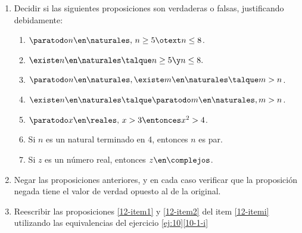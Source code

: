 \begin{enunciado}{\ejercicio}
  \begin{enumerate}[label=\roman*)]
    \item\label{12-itemi}
          Decidir si las siguientes proposiciones son verdaderas o falsas, justificando debidamente:
          \begin{multicols}{2}
            \begin{enumerate}[label=\alph*)]
              \item $\paratodo n \en \naturales,\, n \geq 5 \otext n \leq 8$.
              \item $\existe n \en \naturales \talque n \geq 5 \y n\leq 8.$
              \item $\paratodo n \en \naturales, \existe m \en \naturales \talque m > n$.
              \item $\existe n \en \naturales \talque \paratodo m \en \naturales, m >n$.
              \item\label{12-item1} $\paratodo x \en \reales,\, x > 3 \entonces x^2 > 4$.
              \item\label{12-item2} Si $n$ es un natural terminado en 4, entonces $n$ es par.
              \item Si $z$ es un número real, entonces $z \en \complejos$.
            \end{enumerate}
          \end{multicols}

    \item Negar las proposiciones anteriores, y en cada caso verificar que la proposición negada tiene el valor de verdad
          opuesto al de la original.

    \item Reescribir las proposiciones \ref{12-item1} y \ref{12-item2} del item \ref{12-itemi}
          utilizando las equivalencias del ejercicio \ref{ej:10}\ref{10-1-i}
  \end{enumerate}
\end{enunciado}

